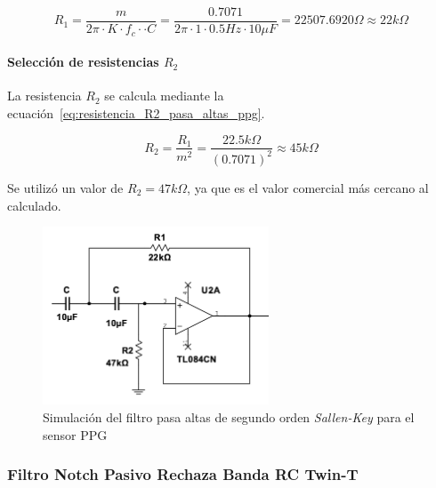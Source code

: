         \begin{equation}
            \label{eq:resistencia_R1_pasa_altas_ppg}
            R_1 = \frac{m}{2\pi \cdot K \cdot f_c \cdot \cdot C} = \frac{0.7071}{2\pi \cdot 1 \cdot 0.5 Hz \cdot 10 \mu F} = 22507.6920 \Omega \approx 22 k\Omega
        \end{equation}

        \paragraph{Selección de resistencias $R_2$}
        La resistencia $R_2$ se calcula mediante la ecuación~\ref{eq:resistencia_R2_pasa_altas_ppg}.

        \begin{equation}
            \label{eq:resistencia_R2_pasa_altas_ppg}
            R_2 = \frac{R_1}{m^2} = \frac{22.5 k\Omega}{(0.7071)^2} \approx 45 k\Omega
        \end{equation}

        Se utilizó un valor de $R_2 = 47 k\Omega$, ya que es el valor comercial más cercano al calculado.


        \begin{figure}[H]
            \centering
            \includegraphics[width=0.6\textwidth]{img/Desarrollo/multisim_pasaAltos_ppg.png}
            \caption[Simulación del filtro pasa altas de segundo orden \textit{Sallen-Key} para el sensor PPG.]{Simulación del filtro pasa altas de segundo orden \textit{Sallen-Key} para el sensor PPG\footnotemark}
            \label{fig:Simulacion_Filtro_Pasa_Altas_PPG}
        \end{figure}

        \subsubsection{Filtro Notch Pasivo Rechaza Banda RC Twin-T}

